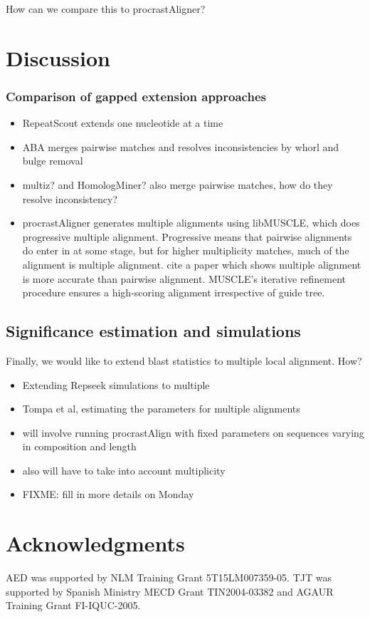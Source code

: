 \documentclass{llncs}
\begin{document}
How can we compare this to procrastAligner? 


\section{Discussion}
\subsubsection{Comparison of gapped
extension approaches}


\begin{itemize}

\item RepeatScout extends one nucleotide at a time
\item ABA merges pairwise matches and resolves inconsistencies by
whorl and bulge removal
\item multiz? and HomologMiner? also merge pairwise matches, how do
they resolve inconsistency?
\item procrastAligner generates multiple alignments using libMUSCLE,
which does progressive multiple alignment.  Progressive means that
pairwise alignments do enter in at some stage, but for higher
multiplicity matches, much of the alignment is multiple alignment.
cite a paper which shows multiple alignment is more accurate than
pairwise alignment.  MUSCLE's iterative refinement procedure ensures
a high-scoring alignment irrespective of guide tree.

\end{itemize}


\subsection{Significance estimation and simulations}

Finally, we would like to extend blast statistics to multiple local alignment. How?
\begin{itemize}
\item Extending Repseek simulations to multiple
\item Tompa et al, estimating the parameters for multiple alignments
\item will involve running procrastAlign with fixed parameters on sequences varying in composition and length
\item also will have to take into account multiplicity
\item FIXME: fill in more details on Monday
\end{itemize}

\section{ Acknowledgments }
AED was supported by NLM Training Grant 5T15LM007359-05. TJT was
supported by Spanish Ministry MECD Grant TIN2004-03382 and AGAUR
Training Grant FI-IQUC-2005.


\small

\end{document}
